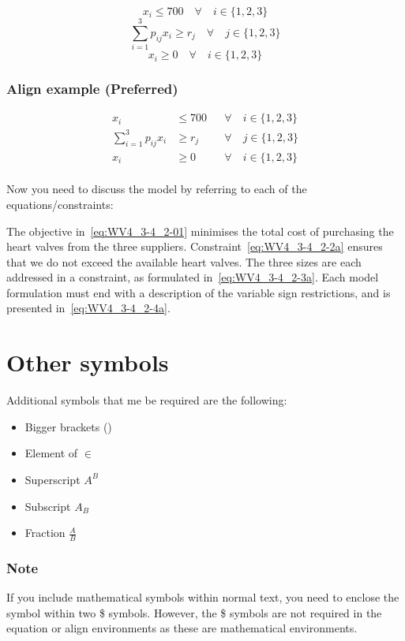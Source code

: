 \documentclass[fleqn, a4paper,12pt]{article}
\begin{document}
\vspace{12pt}
\begin{equation}
x_i \leq 700 \quad \forall \quad i\in\{1,2,3\} \label{eq:WV4_3-4_2-2a}
\end{equation}
\begin{equation}
\sum_{i=1}^{3}{p_{ij} x_i} \geq r_j \quad \forall \quad j\in\{1,2,3\}
\label{eq:WV4_3-4_2-3a}
\end{equation}
\begin{equation}
x_i  \geq 0 \quad \forall \quad i\in\{1,2,3\} \label{eq:WV4_3-4_2-4a}
\end{equation}

\subsubsection*{Align example (Preferred)}

\begin{align}
x_i & \leq 700 && \forall \quad i\in\{1,2,3\} \label{eq:WV4_3-4_2-2b} \\
\sum\limits_{i=1}^{3}{p_{ij} x_i} & \geq r_j && \forall \quad j\in\{1,2,3\}
\label{eq:WV4_3-4_2-3b} \\  
x_i & \geq 0 && \forall \quad i\in\{1,2,3\} \label{eq:WV4_3-4_2-4b}
\end{align}\\

\noindent Now you need to discuss the model by referring to each of the equations/constraints:

\vspace{12pt}
\noindent The objective in~\eqref{eq:WV4_3-4_2-01} minimises the total cost of purchasing
the heart valves from the three suppliers. Constraint~\eqref{eq:WV4_3-4_2-2a}
ensures that we do not exceed the available
heart valves. The three sizes are each addressed in a constraint, as formulated
in~\eqref{eq:WV4_3-4_2-3a}. Each model formulation must end with a description of the variable sign restrictions, and is presented in~\eqref{eq:WV4_3-4_2-4a}.

\section*{Other symbols}
Additional symbols that me be required are the following:
\begin{itemize}
\item Bigger brackets \big(\Big[\bigg\{\Bigg(\Bigg)\bigg\}\Big]\big)
\item Element of $\in$
\item Superscript $A^{B}$
\item Subscript $A_{B}$
\item Fraction $\frac{A}{B}$
\end{itemize}

\subsubsection*{Note}
If you include mathematical symbols within normal text, you need to enclose the symbol
within two \$ symbols. However, the \$ symbols are not required in the equation or align environments as these are mathematical environments.
\end{document}
